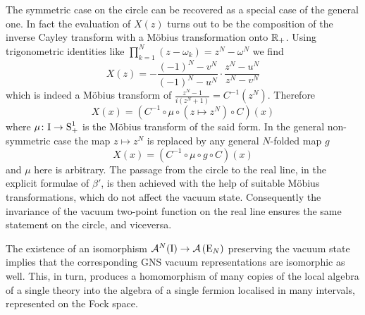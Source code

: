 \bigskip 
The symmetric case on the circle can be recovered as 
a special case of the general one. In fact the evaluation 
of $X(z)$ turns out to be the composition of the inverse 
Cayley transform with a M\"obius transformation onto $\mathbb{R}_+$.
Using trigonometric identities like $\prod^N_{k=1}(z-\omega_k)
=z^N-\omega^N$ we find 
\[
X(z)=-\frac{(-1)^N-v^N}{(-1)^N-u^N}\cdot 
\frac{z^N-u^N}{z^N-v^N}
\]
which is indeed a M\"obius transform of 
$\frac{z^N-1}{i(z^N+1)}=C^{-1}(z^N)$. Therefore 
\[
X(x)=(C^{-1}\circ\mu\circ(z\mapsto z^N)\circ C)(x)
\]
where $\mu\colon\textrm{I}\to\textrm{S}^1_+$ is the M\"obius 
transform of the said form. In the general non-symmetric
case the map $z\mapsto z^N$ is replaced by any general
$N$-folded map $g$
\[
X(x)=(C^{-1}\circ\mu \circ g\circ C)(x)
\]
and $\mu$ here is arbitrary. The passage from the circle 
to the real line, in the explicit formulae of $\beta'$, is 
then achieved with the help of suitable M\"obius transformations,
which do not affect the vacuum state. Consequently the 
invariance of the vacuum two-point function on the real line
ensures the same statement on the circle, and viceversa.

\bigskip 
The existence of an isomorphism $\mathcal{A}^N(\textrm{I})\to
\mathcal{A}\left(\textrm{E}_N\right)$ preserving the vacuum state implies that
the corresponding \ac{GNS} vacuum representations are 
isomorphic as well. This, in turn, produces a homomorphism 
of many copies of the local algebra of a single 
theory into the algebra of a single fermion localised
in many intervals, represented on the Fock space.


















